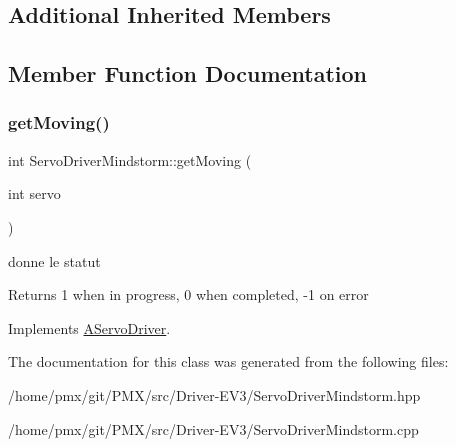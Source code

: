 \subsection*{Additional Inherited Members}


\subsection{Member Function Documentation}
\mbox{\label{classServoDriverMindstorm_acdb0988017ed22bad0bb3dcc848f03f1}} 
\subsubsection{\texorpdfstring{get\+Moving()}{getMoving()}}
{\footnotesize\ttfamily int Servo\+Driver\+Mindstorm\+::get\+Moving (\begin{DoxyParamCaption}\item[{int}]{servo }\end{DoxyParamCaption})\hspace{0.3cm}{\ttfamily [virtual]}}



donne le statut 

\begin{DoxyReturn}{Returns}
1 when in progress, 0 when completed, -\/1 on error 
\end{DoxyReturn}


Implements \hyperlink{classAServoDriver_a954ac7340407b997387d84d7059ed32b}{A\+Servo\+Driver}.



The documentation for this class was generated from the following files\+:\begin{DoxyCompactItemize}
\item 
/home/pmx/git/\+P\+M\+X/src/\+Driver-\/\+E\+V3/Servo\+Driver\+Mindstorm.\+hpp\item 
/home/pmx/git/\+P\+M\+X/src/\+Driver-\/\+E\+V3/Servo\+Driver\+Mindstorm.\+cpp\end{DoxyCompactItemize}

